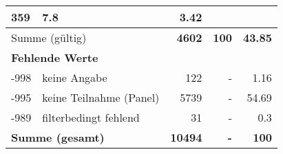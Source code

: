 \begin{longtable}{lXrrr}
       \num{359} &
       \num[round-mode=places,round-precision=2]{7,8} &
         \num[round-mode=places,round-precision=2]{3,42} \\
     \midrule
     \multicolumn{2}{l}{Summe (gültig)} &
       \textbf{\num{4602}} &
     \textbf{100} &
       \textbf{\num[round-mode=places,round-precision=2]{43,85}} \\
     \multicolumn{5}{l}{\textbf{Fehlende Werte}}\\
       -998 &
       keine Angabe &
         \num{122} &
        - &
         \num[round-mode=places,round-precision=2]{1,16} \\
       -995 &
       keine Teilnahme (Panel) &
         \num{5739} &
        - &
         \num[round-mode=places,round-precision=2]{54,69} \\
       -989 &
       filterbedingt fehlend &
         \num{31} &
        - &
         \num[round-mode=places,round-precision=2]{0,3} \\
     \midrule
     \multicolumn{2}{l}{\textbf{Summe (gesamt)}} &
          \textbf{\num{10494}} &
        \textbf{-} &
        \textbf{100} \\
     \bottomrule
     \end{longtable}
     
